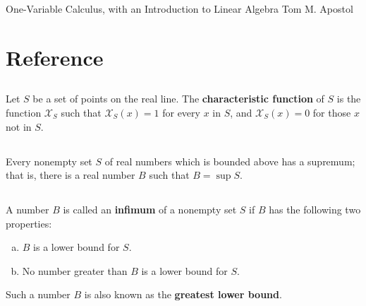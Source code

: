 \documentclass{report}
\begin{document}
\header
  {One-Variable Calculus, with an Introduction to Linear Algebra}
  {Tom M. Apostol}

\tableofcontents

\begingroup
\renewcommand\thechapter{R}
\setcounter{chapter}{0}
\addtocounter{chapter}{-1}

\chapter{Reference}%

\section{}%

  Let $S$ be a set of points on the real line.
  The \textbf{characteristic function} of $S$ is the function $\mathcal{X}_S$
    such that $\mathcal{X}_S(x) = 1$ for every $x$ in $S$, and
    $\mathcal{X}_S(x) = 0$ for those $x$ not in $S$.


\section{}%

  Every nonempty set $S$ of real numbers which is bounded above has a supremum;
    that is, there is a real number $B$ such that $B = \sup{S}$.


\section{}%

  A number $B$ is called an \textbf{infimum} of a nonempty set $S$ if $B$ has
    the following two properties:
    \begin{enumerate}[(a)]
      \item $B$ is a lower bound for $S$.
      \item No number greater than $B$ is a lower bound for $S$.
    \end{enumerate}
  Such a number $B$ is also known as the \textbf{greatest lower bound}.

\end{document}
